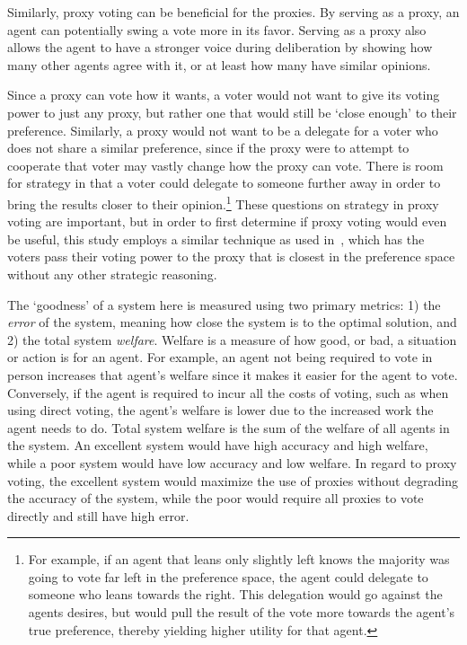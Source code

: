 Similarly, proxy voting can be beneficial for the proxies.
By serving as a proxy, an agent can potentially swing a vote more in its favor.
Serving as a proxy also allows the agent to have a stronger voice during
deliberation by showing how many other agents agree with it, or at least how many
have similar opinions.

Since a proxy can vote how it wants, a voter would not want to give its voting power to
just any proxy, but rather one that would still be `close enough' to their preference.
Similarly, a proxy would not want to be a delegate for a voter who does not share a
similar preference, since if the proxy were to attempt to cooperate that voter may
vastly change how the proxy can vote.
There is room for strategy in that a voter could delegate to someone further away in
order to bring the results closer to their opinion.\footnote{
    For example, if an agent that leans only slightly left knows the majority was going
    to vote far left in the preference space, the agent could delegate to someone who
    leans towards the right.
    This delegation would go against the agents desires, but would pull the result of
    the vote more towards the agent's true preference, thereby yielding higher
    utility for that agent.
}
These questions on strategy in proxy voting are important, but in order to first
determine if proxy voting would even be useful, this study employs a similar technique
as used in~\cite{Cohensius2017}, which has the voters pass their voting power to the
proxy that is closest in the preference space without any other strategic reasoning.

The `goodness' of a system here is measured using two primary metrics: 1) the
\textit{error} of the system, meaning how close the system is to the optimal
solution, and 2) the total system \textit{welfare}.
Welfare is a measure of how good, or bad, a situation or action is for an agent.
For example, an agent not being required to vote in person increases that agent's
welfare since it makes it easier for the agent to vote.
Conversely, if the agent is required to incur all the costs of voting, such as when
using direct voting, the agent's welfare is lower due to the increased work the agent
needs to do.
Total system welfare is the sum of the welfare of all agents in the system.
An excellent system would have high accuracy and high welfare, while a poor system
would have low accuracy and low welfare.
In regard to proxy voting, the excellent system would maximize the use of proxies
without degrading the accuracy of the system, while the poor would require all
proxies to vote directly and still have high error.

